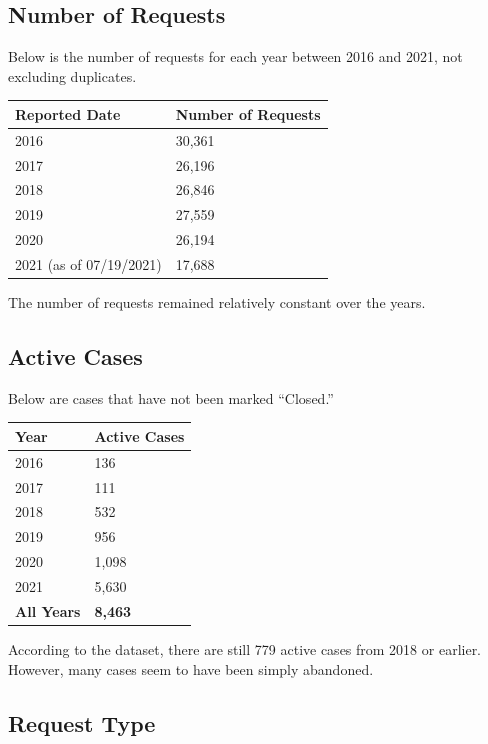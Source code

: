 \documentclass[
  openany]{book}
\begin{document}
\hypertarget{number-of-requests}{%
\subsection{Number of Requests}\label{number-of-requests}}

Below is the number of requests for each year between 2016 and 2021, not excluding duplicates.

\begin{longtable}[]{@{}ll@{}}
\toprule
Reported Date & Number of Requests \\
\midrule
\endhead
2016 & 30,361 \\
2017 & 26,196 \\
2018 & 26,846 \\
2019 & 27,559 \\
2020 & 26,194 \\
2021 (as of 07/19/2021) & 17,688 \\
\bottomrule
\end{longtable}

The number of requests remained relatively constant over the years.

\hypertarget{active-cases}{%
\subsection{Active Cases}\label{active-cases}}

Below are cases that have not been marked ``Closed.''

\begin{longtable}[]{@{}ll@{}}
\toprule
Year & Active Cases \\
\midrule
\endhead
2016 & 136 \\
2017 & 111 \\
2018 & 532 \\
2019 & 956 \\
2020 & 1,098 \\
2021 & 5,630 \\
\textbf{All Years} & \textbf{8,463} \\
\bottomrule
\end{longtable}

According to the dataset, there are still 779 active cases from 2018 or earlier. However, many cases seem to have been simply abandoned.

\hypertarget{request-type}{%
\subsection{Request Type}\label{request-type}}
\end{document}
